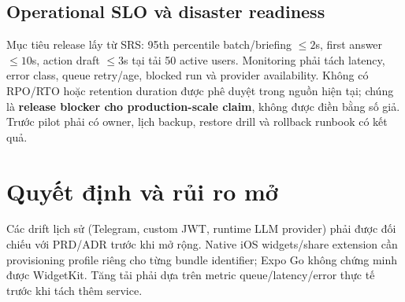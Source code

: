\documentclass[11pt,a4paper]{article}
\begin{document}
\subsection{Operational SLO và disaster readiness}
Mục tiêu release lấy từ SRS: 95th percentile batch/briefing $\leq2$s, first answer $\leq10$s, action draft $\leq3$s tại tải 50 active users. Monitoring phải tách latency, error class, queue retry/age, blocked run và provider availability. Không có RPO/RTO hoặc retention duration được phê duyệt trong nguồn hiện tại; chúng là \textbf{release blocker cho production-scale claim}, không được điền bằng số giả. Trước pilot phải có owner, lịch backup, restore drill và rollback runbook có kết quả.

\section{Quyết định và rủi ro mở}
Các drift lịch sử (Telegram, custom JWT, runtime LLM provider) phải được đối chiếu với PRD/ADR trước khi mở rộng. Native iOS widgets/share extension cần provisioning profile riêng cho từng bundle identifier; Expo Go không chứng minh được WidgetKit. Tăng tải phải dựa trên metric queue/latency/error thực tế trước khi tách thêm service.
\end{document}
